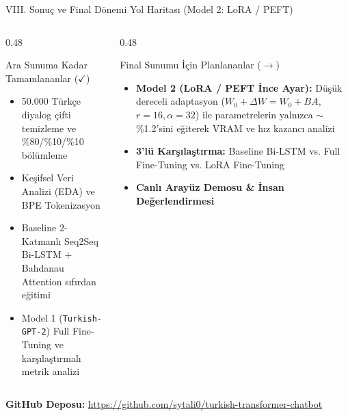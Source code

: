 \documentclass[aspectratio=169,10pt]{beamer}
\begin{document}
\begin{frame}{VIII. Sonuç ve Final Dönemi Yol Haritası (Model 2: LoRA / PEFT)}
    \begin{columns}[T]
        \begin{column}{0.48\textwidth}
            \begin{block}{Ara Sunuma Kadar Tamamlananlar ($\checkmark$)}
                \begin{itemize}
                    \item[$\checkmark$] 50.000 Türkçe diyalog çifti temizleme ve \%80/\%10/\%10 bölümleme
                    \item[$\checkmark$] Keşifsel Veri Analizi (EDA) ve BPE Tokenizasyon
                    \item[$\checkmark$] Baseline 2-Katmanlı Seq2Seq Bi-LSTM + Bahdanau Attention sıfırdan eğitimi
                    \item[$\checkmark$] Model 1 (\texttt{Turkish-GPT-2}) Full Fine-Tuning ve karşılaştırmalı metrik analizi
                \end{itemize}
            \end{block}
        \end{column}
        \begin{column}{0.48\textwidth}
            \begin{block}{Final Sunumu İçin Planlananlar ($\rightarrow$)}
                \begin{itemize}
                    \item[$\rightarrow$] \textbf{Model 2 (LoRA / PEFT İnce Ayar):} Düşük dereceli adaptasyon ($W_0 + \Delta W = W_0 + BA$, $r=16, \alpha=32$) ile parametrelerin yalnızca $\sim$\%1.2'sini eğiterek VRAM ve hız kazancı analizi
                    \item[$\rightarrow$] \textbf{3'lü Karşılaştırma:} Baseline Bi-LSTM vs. Full Fine-Tuning vs. LoRA Fine-Tuning
                    \item[$\rightarrow$] \textbf{Canlı Arayüz Demosu \& İnsan Değerlendirmesi}
                \end{itemize}
            \end{block}
        \end{column}
    \end{columns}
    \vspace{6pt}
    \centering
    \textbf{GitHub Deposu:} \url{https://github.com/sytali0/turkish-transformer-chatbot}
\end{frame}
\end{document}
